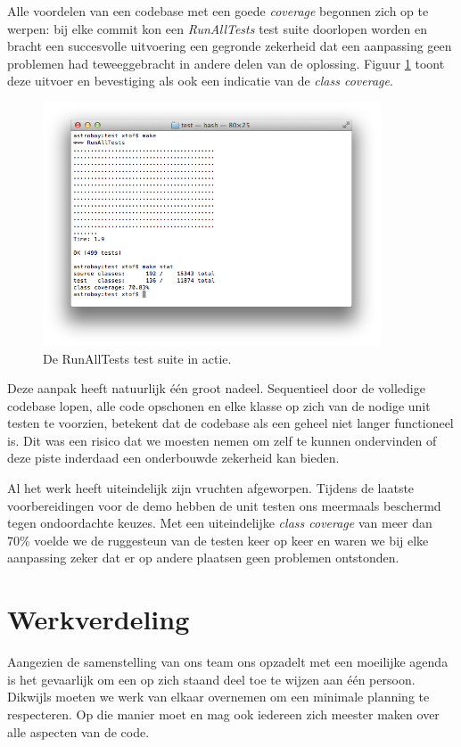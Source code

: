 \documentclass[12pt,a4paper]{report}
\begin{document}
Alle voordelen van een codebase met een goede \emph{coverage} begonnen zich op te werpen: bij elke commit kon een \emph{RunAllTests} test suite doorlopen worden en bracht een succesvolle uitvoering een gegronde zekerheid dat een aanpassing geen problemen had teweeggebracht in andere delen van de oplossing. Figuur \ref{fig:runalltests} toont deze uitvoer en bevestiging als ook een indicatie van de \emph{class coverage}.

\begin{figure}[htbp]
  \centering
  \includegraphics[width=100mm]{resources/runalltests.png}
  \caption{De RunAllTests test suite in actie.}
  \label{fig:runalltests}
\end{figure}

Deze aanpak heeft natuurlijk \'e\'en groot nadeel. Sequentieel door de volledige codebase lopen, alle code opschonen en elke klasse op zich van de nodige unit testen te voorzien, betekent dat de codebase als een geheel niet langer functioneel is. Dit was een risico dat we moesten nemen om zelf te kunnen ondervinden of deze piste inderdaad een onderbouwde zekerheid kan bieden.

Al het werk heeft uiteindelijk zijn vruchten afgeworpen. Tijdens de laatste voorbereidingen voor de demo hebben de unit testen ons meermaals beschermd tegen ondoordachte keuzes. Met een uiteindelijke \emph{class coverage} van meer dan 70\% voelde we de ruggesteun van de testen keer op keer en waren we bij elke aanpassing zeker dat er op andere plaatsen geen problemen ontstonden.

\chapter{Werkverdeling}

Aangezien de samenstelling van ons team ons opzadelt met een moeilijke agenda is het gevaarlijk om een op zich staand deel toe te wijzen aan \'e\'en persoon. Dikwijls moeten we werk van elkaar overnemen om een minimale planning te respecteren. Op die manier moet en mag ook iedereen zich meester maken over alle aspecten van de code.
\end{document}
